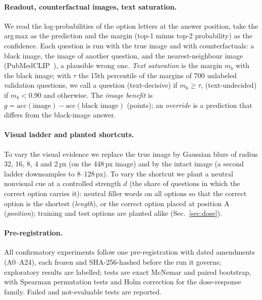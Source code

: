 \paragraph{Readout, counterfactual images, text saturation.}
We read the log-probabilities of the option letters at the answer position, take the arg\,max as the prediction and the margin (top-1 minus top-2 probability) as the confidence.
Each question is run with the true image and with counterfactuals: a black image, the image of another question, and the nearest-neighbour image (PubMedCLIP~\cite{eslami2023pubmedclip}), a plausible wrong one.
\emph{Text saturation} is the margin $m_b$ with the black image; with $\tau$ the 15th percentile of the margins of 700 unlabeled validation questions, we call a question \HI{} (text-decisive) if $m_b\ge\tau$, \LO{} (text-undecided) if $m_b<0.90$ and \MID{} otherwise.
The \emph{image benefit} is $g=\mathrm{acc}(\text{image})-\mathrm{acc}(\text{black image})$ (points); an \emph{override} is a prediction that differs from the black-image answer.

\paragraph{Visual ladder and planted shortcuts.}
To vary the visual evidence we replace the true image by Gaussian blurs of radius 32, 16, 8, 4 and 2\,px (on the 448\,px image) and by the intact image (a second ladder downsamples to 8--128\,px).
To vary the shortcut we plant a neutral nonvisual cue at a controlled strength $d$ (the share of questions in which the correct option carries it): neutral filler words on all options so that the correct option is the shortest (\emph{length}), or the correct option placed at position A (\emph{position}); training and test options are planted alike (Sec.~\ref{sec:dose}).

\paragraph{Pre-registration.}
All confirmatory experiments follow one pre-registration with dated amendments (A0--A24), each frozen and SHA-256-hashed before the run it governs; exploratory results are labelled; tests are exact McNemar and paired bootstrap, with Spearman permutation tests and Holm correction for the dose-response family.
Failed and not-evaluable tests are reported.
